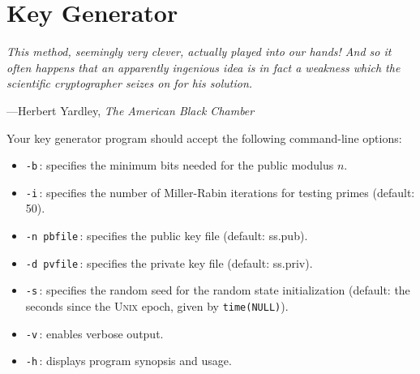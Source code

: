 \section{Key Generator}
\epigraph{\emph{This method, seemingly very clever, actually played into our hands! And so it often happens that an apparently ingenious idea is in fact a weakness which the scientific cryptographer seizes on for his solution.}}{---Herbert Yardley, \emph{The American Black Chamber}}

\noindent
Your key generator program should accept the following command-line
options:
\begin{itemize}
  \item \texttt{-b}\,: specifies the minimum bits needed for the public
    modulus $n$.
  \item \texttt{-i}\,: specifies the number of Miller-Rabin iterations
    for testing primes (default: 50).
  \item \texttt{-n pbfile}\,: specifies the public key file (default:
    ss.pub).
  \item \texttt{-d pvfile}\,: specifies the private key file (default:
    ss.priv).
  \item \texttt{-s}\,: specifies the random seed for the random state
    initialization (default: the seconds since the \textsc{Unix} epoch,
    given by \texttt{time(NULL)}).
  \item \texttt{-v}\,: enables verbose output.
  \item \texttt{-h}\,: displays program synopsis and usage.
\end{itemize}

